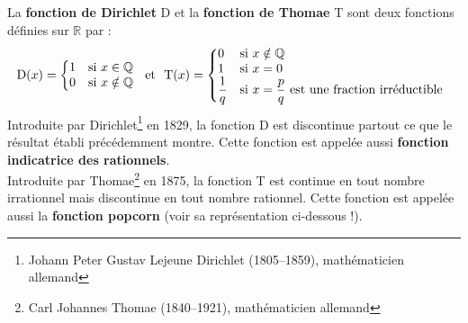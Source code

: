 \begin{enigme}
La \textbf{fonction de Dirichlet} D et la \textbf{fonction de Thomae} T sont deux fonctions définies sur $\mathbb{R}$ par  :
\[\text{D}(x)=\left\{\begin{matrix} 1  &  \text{si~} x\in\mathbb{Q} \\ 0  & \text{si~} x\notin\mathbb{Q} \end{matrix}\right.
\text{~~et~~} \text{T}(x)=\left\{\begin{array}{@{}ll} 0  & \text{si~} x\notin\mathbb{Q} \\ 1 & \text{si~} x=0 \\ \dfrac{1}{q} & \text{si~} x=\dfrac{p}{q} \text{~est une fraction irréductible}\end{array}\right.\]
Introduite par Dirichlet\footnote{Johann Peter Gustav Lejeune Dirichlet (1805–1859), mathématicien allemand}  en 1829, la fonction D est discontinue partout ce que le résultat établi précédemment montre. Cette fonction est appelée aussi \textbf{fonction indicatrice des rationnels}.\\
Introduite par Thomae\footnote{Carl Johannes Thomae (1840–1921), mathématicien allemand} en 1875, la fonction T est continue en tout nombre irrationnel mais  discontinue en tout nombre rationnel. Cette fonction est appelée aussi la \textbf{fonction popcorn} (voir sa représentation ci-dessous !).
\begin{center}

\end{center}


\end{enigme} 






